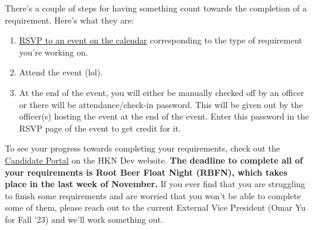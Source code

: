 \documentclass[11pt, article, oneside]{memoir}
\begin{document}
        \bigbreak

        There's a couple of steps for having something count towards the completion of a requirement. Here's what they are:
        \begin{enumerate}
            \item \href{https://dev-hkn.eecs.berkeley.edu/events/}{RSVP to an event on the calendar} corresponding to the type of requirement you're working on.
            \item Attend the event (lol).
            \item At the end of the event, you will either be manually checked off by an officer or there will be attendance/check-in password. This will be given out by the officer(s) hosting the event at the end of the event. Enter this password in the RSVP page of the event to get credit for it.
        \end{enumerate}

        To see your progress towards completing your requirements, check out the \href{https://dev-hkn.eecs.berkeley.edu/cand/}{Candidate Portal} on the HKN Dev website. \textbf{The deadline to complete all of your requirements is Root Beer Float Night (RBFN), which takes place in the last week of November.} If you ever find that you are struggling to finish some requirements and are worried that you won't be able to complete some of them, please reach out to the current External Vice President (Omar Yu for Fall '23) and we'll work something out.

        \bigbreak
\end{document}
